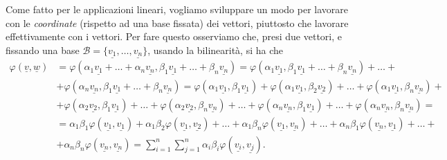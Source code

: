 Come fatto per le applicazioni lineari, vogliamo sviluppare un modo per lavorare con le \emph{coordinate} (rispetto ad una base fissata) dei vettori, piuttosto che lavorare effettivamente con i vettori. Per fare questo osserviamo che, presi due vettori, e fissando una base $\mathcal{B} = \{ \underline{v_1}, \ldots, \underline{v_n} \}$, usando la bilinearità, si ha che
\begin{align}
	\varphi(\underline{v}, \underline{w}) &= \varphi(\alpha_1 \underline{v_1} + \ldots + \alpha_n \underline{v_n}, \beta_1 \underline{v_1} + \ldots + \beta_n \underline{v_n}) = \varphi(\alpha_1 \underline{v_1}, \beta_1 \underline{v_1} + \ldots + \beta_n \underline{v_n}) + \ldots + \\
	&+\varphi(\alpha_n \underline{v_n}, \beta_1 \underline{v_1} + \ldots + \beta_n \underline{v_n}) = \varphi(\alpha_1 \underline{v_1}, \beta_1 \underline{v_1}) + \varphi(\alpha_1 \underline{v_1}, \beta_2 \underline{v_2}) + \ldots + \varphi(\alpha_1 \underline{v_1}, \beta_n \underline{v_n}) + \\ 
	&+ \varphi(\alpha_2 \underline{v_2}, \beta_1 \underline{v_1}) + \ldots + \varphi(\alpha_2 \underline{v_2}, \beta_n \underline{v_n}) + \ldots + \varphi(\alpha_n \underline{v_n}, \beta_1 \underline{v_1}) + \ldots + \varphi(\alpha_n \underline{v_n}, \beta_n \underline{v_n}) = \\
	&= \alpha_1 \beta_1 \varphi(\underline{v_1}, \underline{v_1}) + \alpha_1 \beta_2 \varphi(\underline{v_1}, \underline{v_2}) + \ldots + \alpha_1 \beta_n \varphi (\underline{v_1}, \underline{v_n}) + \ldots + \alpha_n \beta_1 \varphi(\underline{v_n}, \underline{v_1}) + \ldots + \\
	&+ \alpha_n \beta_n \varphi(\underline{v_n}, \underline{v_n}) = \sum_{i=1}^n \sum_{j=1}^n \alpha_i \beta_i \varphi(\underline{v_i}, \underline{v_j}).
\end{align}

